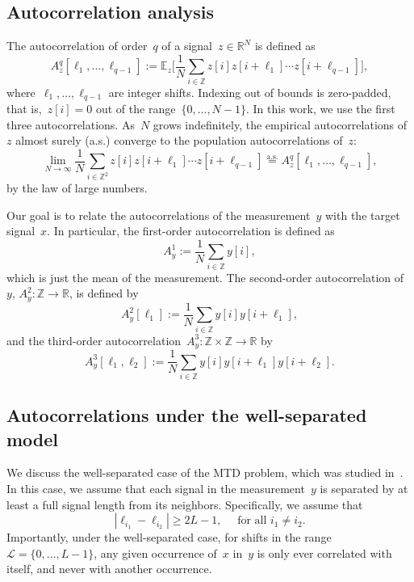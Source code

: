 \documentclass{article}
\begin{document}
\subsection{Autocorrelation analysis}
\label{subsec:ac}
The autocorrelation of order~$q$ of a signal~\mbox{$z \in \mathbb{R}^{N}$} is defined as
\begin{equation}
A_z^q[\ell_1, \ldots, \ell_{q-1}] := \mathbb{E}_z\Big[\frac{1}{N} \sum_{i \in \mathbb{Z}} z[i] z[i + \ell_1] \cdots z[i + \ell_{q-1}]\Big],
\end{equation}
where~$\ell_1, \ldots, \ell_{q-1}$ are integer shifts. Indexing out of bounds is zero-padded, that is,~\mbox{$z[i] = 0$} out of the range~\mbox{$\{0, \ldots, {N-1}\}$}. In this work, we use the first three autocorrelations. As~$N$ grows indefinitely, the empirical autocorrelations of~$z$ almost surely (a.s.) converge to the population autocorrelations of~$z$:
\begin{equation}
\lim_{N \rightarrow \infty} \frac{1}{N} \sum_{i \in \mathbb{Z}^2} z[i] z[i + \ell_1] \cdots z[i + \ell_{q-1}] \stackrel{\text{a.s.}}{=}A_z^q[\ell_1, \ldots, \ell_{q-1}],
\end{equation}
by the law of large numbers.

Our goal is to relate the autocorrelations of the measurement~$y$ with the target signal~$x$. In particular, the first-order autocorrelation is defined as
\begin{equation}
A_{y}^1 := \frac{1}{N} \sum_{i \in \mathbb{Z}} y[i],
\end{equation}
which is just the mean of the measurement. The second-order autocorrelation of~$y$, \mbox{$A_{y}^2: \mathbb{Z} \rightarrow \mathbb{R}$}, is defined by
\begin{equation}
A_{y}^2 [\ell_1] := \frac{1}{N} \sum_{i \in \mathbb{Z}} y[i] y[i + \ell_1],
\end{equation}
and the third-order autocorrelation~\mbox{$A_{y}^3: \mathbb{Z} \times \mathbb{Z} \rightarrow \mathbb{R}$} by
\begin{equation}
A_{y}^3 [\ell_1, \ell_2] := \frac{1}{N} \sum_{i \in \mathbb{Z}} y[i] y[i + \ell_1] y[i + \ell_2].
\end{equation}



\subsection{Autocorrelations under the well-separated model}
\label{subsec:relations}
We discuss the \mbox{well-separated} case of the MTD problem, which was studied in~\cite{bendory2019multi}. In this case, we assume that each signal in the measurement~$y$ is separated by at least a full signal length from its neighbors. Specifically, we assume that
\begin{equation}
\label{eq:sep}
|\ell_{i_1} - \ell_{i_2}| \ge 2L - 1, \quad \text{ for all } i_1 \ne i_2.
\end{equation}
Importantly, under the well-separated case, for shifts in the range \mbox{$\mathcal{L} = \{0, \ldots, {L - 1}\}$}, any given occurrence of~$x$ in~$y$ is only ever correlated with itself, and never with another occurrence.
\end{document}
